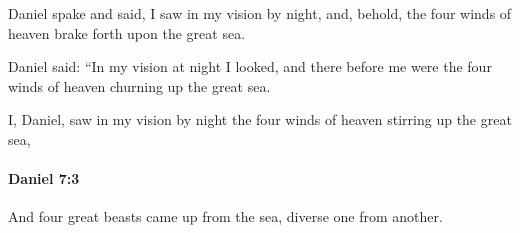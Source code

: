 			\begin{versebox}
					\item[BHS] 
					\item[LXX] 
					\item[ASV] Daniel spake and said, I saw in my vision by night, and, behold, the four winds of heaven brake forth upon the great sea.
					\item[NIV] Daniel said: “In my vision at night I looked, and there before me were the four winds of heaven churning up the great sea.
					\item[NRSV] I, Daniel, saw in my vision by night the four winds of heaven stirring up the great sea,
			\end{versebox}

		\paragraph{Daniel 7:3} %
			\label{DANIEL-7-3}

			And four great beasts came up from the sea, diverse one from another.

